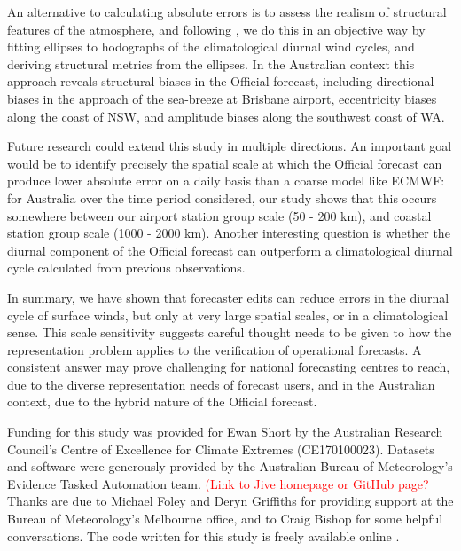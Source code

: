 \documentclass[twocol]{ametsoc}
\begin{document}
An alternative to calculating absolute errors is to assess the realism of structural features of the atmosphere, and following \citet{gille05}, we do this in an objective way by fitting ellipses to hodographs of the climatological diurnal wind cycles, and deriving structural metrics from the ellipses. In the Australian context this approach reveals structural biases in the Official forecast, including directional biases in the approach of the sea-breeze at Brisbane airport, eccentricity biases along the coast of NSW, and amplitude biases along the southwest coast of WA.  

Future research could extend this study in multiple directions. An important goal would be to identify precisely the spatial scale at which the Official forecast can produce lower absolute error on a daily basis than a coarse model like ECMWF: for Australia over the time period considered, our study shows that this occurs somewhere between our airport station group scale (50 - 200 km), and coastal station group scale (1000 - 2000 km). Another interesting question is whether the diurnal component of the Official forecast can outperform a climatological diurnal cycle calculated from previous observations. 

In summary, we have shown that forecaster edits can reduce errors in the diurnal cycle of surface winds, but only at very large spatial scales, or in a climatological sense. This scale sensitivity suggests careful thought needs to be given to how the representation problem applies to the verification of operational forecasts. A consistent answer may prove challenging for national forecasting centres to reach, due to the diverse representation needs of forecast users, and in the Australian context, due to the hybrid nature of the Official forecast.

\acknowledgments
Funding for this study was provided for Ewan Short by the Australian Research Council's Centre of Excellence for Climate Extremes (CE170100023). Datasets and software were generously provided by the Australian Bureau of Meteorology's Evidence Tasked Automation team. \textcolor{red}{(Link to Jive homepage or GitHub page?} Thanks are due to Michael Foley and Deryn Griffiths for providing support at the Bureau of Meteorology's Melbourne office, and to Craig Bishop for some helpful conversations. The code written for this study is freely available online \citep{shortGitVeri19}.



\end{document}
